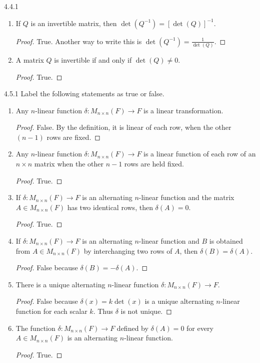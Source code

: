 \documentclass[12pt, a4paper]{article}
\theoremstyle{plain}
\begin{document}
\begin{exercise}{4.4.1}
\begin{enumerate}[label=(\alph*)]
	\begin{proof}
	True.
	\end{proof}
\item If $Q$ is an invertible matrix, then $\det(Q^{-1})=[\det(Q)]^{-1}$.
	\begin{proof}
	True. Another way to write this is $\det(Q^{-1})=\frac{1}{\det(Q)}$.
	\end{proof}
\item A matrix $Q$ is invertible if and only if $\det(Q)\neq 0$.
	\begin{proof}
	True.
	\end{proof}
\end{enumerate}
\end{exercise}

\begin{exercise}{4.5.1}
Label the following statements as true or false.
	\begin{enumerate}[label=(\alph*)]
	\item Any $n$-linear function $\delta:M_{n\times n}(F)\rightarrow F$ is a linear transformation.
	\begin{proof}
	False. By the definition, it is linear of each row, when the other $(n-1)$ rows are fixed.
	\end{proof}
	
	\item Any $n$-linear function $\delta:M_{n\times n}(F)\rightarrow F$ is a linear function of each row of an $n\times n$ matrix when the other $n-1$ rows are held fixed.
	\begin{proof}
	True.
	\end{proof}
	\item If $\delta:M_{n\times n}(F)\rightarrow F$ is an alternating $n$-linear function and the matrix $A\in M_{n\times n}(F)$ has two identical rows, then $\delta(A)=0$.	
	\begin{proof}
	True.
	\end{proof}
	\item If $\delta:M_{n\times n}(F)\rightarrow F$ is an alternating $n$-linear function and $B$ is obtained from $A\in M_{n\times n}(F)$ by interchanging two rows of $A$, then $\delta(B)=\delta(A)$.
	\begin{proof}
	False because $\delta(B)=-\delta(A)$.
	\end{proof}
	\item There is a unique alternating $n$-linear function $\delta:M_{n\times n}(F)\rightarrow F$.
	\begin{proof}
	False because $\delta(x)=k\det(x)$ is a unique alternating $n$-linear function for each scalar $k$. Thus $\delta$ is not unique.
	\end{proof}
	\item The function $\delta:M_{n\times n}(F)\rightarrow F$ defined by $\delta (A)=0$ for every $A\in M_{n\times n}(F)$ is an alternating $n$-linear function.
	\begin{proof}
	True.
	\end{proof}
	\end{enumerate}
\end{exercise}
\end{document}
